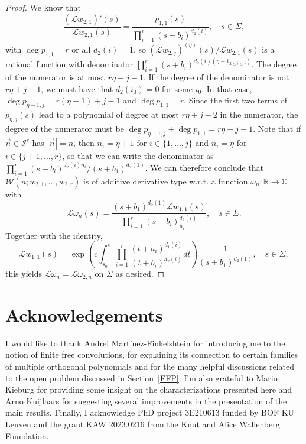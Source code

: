 \documentclass[a4paper,12pt,oneside]{article}
\theoremstyle{definition}
\newcommand{\C}{\mathbb{C}}
\newcommand{\R}{\mathbb{R}}
\newcommand{\om}{\omega}
\newcommand{\sz}[1]{\left| \vec{#1} \right|}
\newcommand{\LT}[1]{\mathcal{L}#1}
\begin{document}
\begin{proof}
    We know that 
    $$\frac{(\LT{w_{2,1}})'(s)}{\LT{w_{2,1}}(s)} = \frac{p_{1,1}(s)}{\prod_{i=1}^{r} (s+b_i)^{d_2(i)}},\quad s\in\Sigma,$$
     with $\deg p_{1,1} = r$ or all $d_2(i)=1$, so $(\LT{w_{2,j}})^{(\eta)}(s)/\LT{w_{2,1}}(s)$ is a rational function with denominator $\prod_{i=1}^{r} (s+b_i)^{d_2(i)(\eta+1_{2\leq i\leq j})} $. The degree of the numerator is at most $r\eta+j-1$. If the degree of the denominator is not $r\eta+j-1$, we must have that $d_2(i_0)=0$ for some $i_0$. In that case, $\deg p_{\eta-1,j}=r(\eta-1)+j-1$ and $\deg p_{1,1}= r$. Since the first two terms of $p_{\eta,j}(s)$ lead to a polynomial of degree at most $r\eta+j-2$ in the numerator, the degree of the numerator must be $\deg p_{\eta-1,j}+\deg p_{1,1}= r\eta+j-1$. Note that if $\vec{n}\in\mathcal{S}^r$ has $\sz{n}=n$, then $n_i = \eta+1$ for $i\in\{1,\dots,j\}$ and $n_i = \eta$ for $i\in\{j+1,\dots,r\}$, so that we can write the denominator as $\prod_{i=1}^r (s+b_i)^{d_2(i)n_i}/(s+b_1)^{d_2(1)}$. We can therefore conclude that $\mathcal{W}(n;w_{2,1},\dots,w_{2,r})$ is of additive derivative type w.r.t. a function $\om_n:\R\to\C$ with    
        $$ \LT{\om_n}(s) = \frac{(s+b_1)^{d_2(1)}\LT{w_{1,1}}(s)}{\prod_{i=1}^r (s+b_i)_{n_i}^{d_2(i)}},\quad s\in\Sigma. $$
    Together with the identity,
        $$ \LT{w_{1,1}}(s) = \exp\left( c  \int_{s_0}^{s} \prod_{i=1}^r \frac{(t+a_i)^{d_1(i)}}{(t+b_i)^{d_2(i)}} dt \right) \frac{1}{(s+b_1)^{d_2(1)}} ,\quad s\in\Sigma,$$
    this yields $\LT{\om_n}=\LT{\om_{2,n}}$ on $\Sigma$ as desired.
\end{proof}


\section*{Acknowledgements}

I would like to thank Andrei Martínez-Finkelshtein for introducing me to the notion of finite free convolutions, for explaining its connection to certain families of multiple orthogonal polynomials and for the many helpful discussions related to the open problem discussed in Section~\ref{FFP}. I'm also grateful to Mario Kieburg for providing some insight on the characterizations presented here and Arno Kuijlaars for suggesting several improvements in the presentation of the main results. Finally, I acknowledge PhD project 3E210613 funded by BOF KU Leuven and the grant KAW 2023.0216 from the Knut and Alice Wallenberg Foundation.
\end{document}
